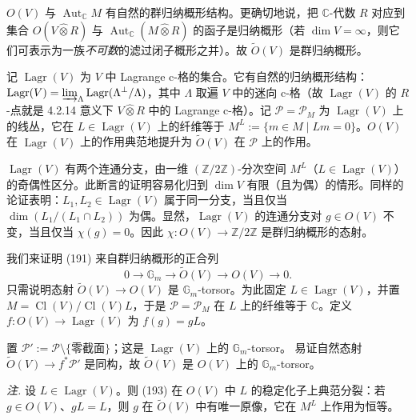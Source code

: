 $O(V)$ 与 $\operatorname{Aut}_{\mathbb{C}}M$ 有自然的群归纳概形结构。更确切地说，把 $\mathbb{C}$-代数 $R$ 对应到集合 $O(V\hat{\otimes}R)$ 与 $\operatorname{Aut}_{\mathbb{C}}(M\hat{\otimes}R)$ 的函子是归纳概形（若 $\dim V=\infty$，则它们可表示为一族\emph{不可数}的滤过闭子概形之并）。故 $\tilde{O}(V)$ 是群归纳概形。

记 $\operatorname{Lagr}(V)$ 为 $V$ 中 Lagrange c-格的集合。它有自然的归纳概形结构：$\operatorname{Lagr}(V)=\varinjlim_{\Lambda}\operatorname{Lagr}(\Lambda^{\perp}/\Lambda)$，其中 $\Lambda$ 取遍 $V$ 中的迷向 c-格（故 $\operatorname{Lagr}(V)$ 的 $R$-点就是 4.2.14 意义下 $V\hat{\otimes}R$ 中的 Lagrange c-格）。记 $\mathcal{P}=\mathcal{P}_{M}$ 为 $\operatorname{Lagr}(V)$ 上的线丛，它在 $L\in\operatorname{Lagr}(V)$ 上的纤维等于 $M^{L}:=\{m\in M\mid Lm=0\}$。$O(V)$ 在 $\operatorname{Lagr}(V)$ 上的作用典范地提升为 $\tilde{O}(V)$ 在 $\mathcal{P}$ 上的作用。

$\operatorname{Lagr}(V)$ 有两个连通分支，由一维 $(\mathbb{Z}/2\mathbb{Z})$-分次空间 $M^{L}$（$L\in\operatorname{Lagr}(V)$）的奇偶性区分。此断言的证明容易化归到 $\dim V$ 有限（且为偶）的情形。同样的论证表明：$L_{1},L_{2}\in\operatorname{Lagr}(V)$ 属于同一分支，当且仅当 $\dim(L_{1}/(L_{1}\cap L_{2}))$ 为偶。显然，$\operatorname{Lagr}(V)$ 的连通分支对 $g\in O(V)$ 不变，当且仅当 $\chi(g)=0$。因此 $\chi:O(V)\to\mathbb{Z}/2\mathbb{Z}$ 是群归纳概形的态射。

我们来证明 (191) 来自群归纳概形的正合列
\begin{equation}\tag{193}
0\to\mathbb{G}_{m}\to\tilde{O}(V)\to O(V)\to 0.
\end{equation}
只需说明态射 $\tilde{O}(V)\to O(V)$ 是 $\mathbb{G}_{m}$-torsor。为此固定 $L\in\operatorname{Lagr}(V)$，并置 $M=\operatorname{Cl}(V)/\operatorname{Cl}(V)L$，于是 $\mathcal{P}=\mathcal{P}_{M}$ 在 $L$ 上的纤维等于 $\mathbb{C}$。定义 $f:O(V)\to\operatorname{Lagr}(V)$ 为 $f(g)=gL$。


置 $\mathcal{P}':=\mathcal{P}\setminus\{\text{零截面}\}$；这是 $\operatorname{Lagr}(V)$ 上的 $\mathbb{G}_{m}$-torsor。
易证自然态射 $\tilde{O}(V)\to f^{*}\mathcal{P}'$ 是同构，故 $\tilde{O}(V)$ 是 $O(V)$ 上的 $\mathbb{G}_{m}$-torsor。

\emph{注.} 设 $L\in\operatorname{Lagr}(V)$。则 (193) 在 $O(V)$ 中 $L$ 的稳定化子上典范分裂：若 $g\in O(V)$、$gL=L$，则 $g$ 在 $\tilde{O}(V)$ 中有唯一原像，它在 $M^{L}$ 上作用为恒等。

